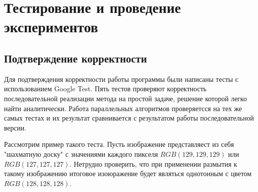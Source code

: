 \documentclass{article}
\begin{document}
\newpage
\section*{Тестирование и проведение экспериментов}
\subsection*{Подтверждение корректности}
\par Для подтверждения корректности работы программы были написаны тесты с использованием Google Test. Пять тестов проверяют корректность последовательной реализации метода на простой задаче, решение которой легко найти аналитически. Работа параллельных алгоритмов проверяетсся на тех же самых тестах и их результат сравнивается с результатом работы последовательной версии.
\par
Рассмотрим пример такого теста. Пусть изображение представляест из себя "шахматную доску" с значениями каждого пикселя $RGB(129, 129, 129)$ или $RGB(127, 127, 127)$. Нетрудно проверить, что при применении размытия к такому изображению итоговое изоюражение будет являться однотонным с цветом $RGB(128, 128, 128)$.
\newpage
\end{document}

